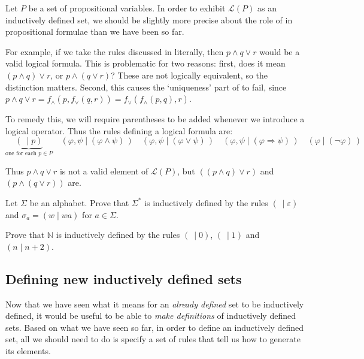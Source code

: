 \begin{example}
\label{exInductivelyDefinedSetOfPropositionalFormulae}
Let $P$ be a set of propositional variables. In order to exhibit $\mathcal{L}(P)$ as an inductively defined set, we should be slightly more precise about the role of \textit{} in propositional formulae than we have been so far.

For example, if we take the rules discussed in  literally, then $p \wedge q \vee r$ would be a valid logical formula. This is problematic for two reasons: first, does it mean $(p \wedge q) \vee r$, or $p \wedge (q \vee r)$? These are not logically equivalent, so the distinction matters. Second, this causes the `uniqueness' part of  to fail, since $p \wedge q \vee r = f_{\wedge}(p,f_{\vee}(q,r)) = f_{\vee}(f_{\wedge}(p,q),r)$.

To remedy this, we will require parentheses to be added whenever we introduce a logical operator. Thus the rules defining a logical formula are:
\[ \underbrace{(~ \mid p)}_{\text{one for each } p \in P} \quad (\varphi,\psi \mid (\varphi \wedge \psi)\,) \quad (\varphi,\psi \mid (\varphi \vee \psi)\,) \quad (\varphi,\psi \mid (\varphi \Rightarrow \psi)\,) \quad (\varphi \mid (\neg \varphi)\,) \]

Thus $p \wedge q \vee r$ is not a valid element of $\mathcal{L}(P)$, but $((p \wedge q) \vee r)$ and $(p \wedge (q \vee r))$ are.
\end{example}

\begin{exercise}
Let $\Sigma$ be an alphabet. Prove that $\Sigma^*$ is inductively defined by the rules $(~ \mid \varepsilon)$ and $\sigma_a = (w \mid wa)$ for $a \in \Sigma$.
\end{exercise}

\begin{exercise}
Prove that $\mathbb{N}$ is inductively defined by the rules $(~ \mid 0)$, $(~ \mid 1)$ and $(n \mid n+2)$.
\end{exercise}

\subsection*{Defining new inductively defined sets}

Now that we have seen what it means for an \textit{already defined} set to be inductively defined, it would be useful to be able to \textit{make definitions} of inductively defined sets. Based on what we have seen so far, in order to define an inductively defined set, all we should need to do is specify a set of rules that tell us how to generate its elements.

